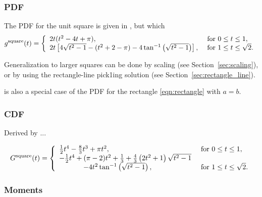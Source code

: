 \subsubsection{PDF}

The PDF for the unit square is given in
\cite{philip:_probab_distr_distan_between_two,weisstein:_squar_line_picking},
but which
\begin{equation}
  \label{eq:square_line}
  g^{\rm square}(t) = \left\{ \begin{array}{ll}
      2t (t^2-4t+\pi), & \mbox{ for } 0 \leq t \leq 1, \\
      2t \left[4 \sqrt{t^2-1} - (t^2+2-\pi) - 4 \tan^{-1} \left(\sqrt{t^2-1} \right)\right], 
               & \mbox{ for } 1 \leq t \leq \sqrt{2} . \\ 
    \end{array} \right.
\end{equation}

Generalization to larger squares can be done by scaling (see
Section~\ref{sec:scaling}), or by using the rectangle-line pick1ing
solution (see Section~\ref{sec:rectangle_line}).


 is also a special case of the PDF for the rectangle
\eqref{eqn:rectangle} with $a=b$.

\subsubsection{CDF}
Derived by ...

\begin{equation}
  \label{eq:square_cdf}
  G^{\rm square}(t) = \left\{ \begin{array}{ll}
      \frac{1}{2} t^4 - \frac{8}{3} t^3 + \pi t^2, 
               & \mbox{ for } 0 \leq t \leq 1, \\
      -\frac{1}{2} t^4 + (\pi-2)t^2 + \frac{1}{3}
                   +\frac{4}{3} \left( 2t^2+1 \right)\sqrt{t^2-1} 
                     & \\
                   \hspace{12mm} - 4 t^2 \tan^{-1} \left(\sqrt{t^2-1} \right),
               & \mbox{ for } 1 \leq t \leq \sqrt{2} . \\ 
    \end{array} \right.
\end{equation}

\subsubsection{Moments}


